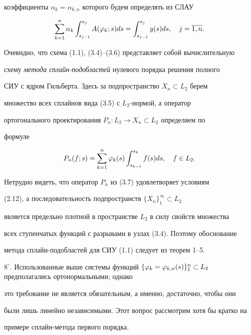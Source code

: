 коэффициенты $\alpha_k = \alpha_{k,n}$ которого будем определять из СЛАУ


\begin{equation}


\suml_{k=1}^n\alpha_k \int_{s_{j-1}}^{s_j}A(\vp_k;s)ds = \int_{s_{j-


1}}^{s_j}y(s)ds,\quad j=\ol{1,n}.


\end{equation}


Очевидно, что схема (1.1), (3.4)--(3.6) представляет собой вычислительную


схему {\it метода сплайн-подобластей} нулевого порядка решения полного


СИУ с ядром Гильберта. Здесь за подпространство $X_n\subset L_2$ берем


множество всех сплайнов вида (3.5) с $L_2$-нормой, а оператор


ортогонального проектирования $P_n:L_2\to X_n\subset L_2$ определяем по


формуле


\begin{equation}


P_n(f;s) = \suml_{k=1}^n\vp_k(s)\int_{s_{k-1}}^{s_k}f(s)ds, \quad f\in


L_2.


\end{equation}


Нетрудно видеть, что оператор $P_n$ из (3.7) удовлетворяет условиям


(2.12), а последовательность подпространств $\{X_n\}_1^\infty\subset L_2$


является предельно плотной в пространстве $L_2$ в силу свойств множества


всех ступенчатых функций с разрывами в узлах (3.4). Поэтому обоснование


метода сплайн-подобластей для СИУ (1.1) следует из теорем 1--5.





$8^\circ$. Использованные выше системы функций $\{\vp_k =


\vp_{k,n}(s)\}_{1}^{n}\subset L_2$ предполагались ортонормальными; однако


это требование не является обязательным, а именно, достаточно, чтобы они


были лишь линейно независимыми. Этот вопрос рассмотрим хотя бы кратко на


примере сплайн-метода первого порядка.





